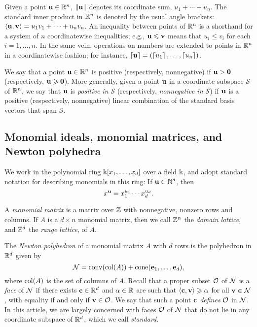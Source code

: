 \documentclass[11pt]{amsart}
\begin{document}
Given a point $\mathbf{u}\in \mathbb{R}^n$, $\| \mathbf{u} \|$ denotes its coordinate sum, $u_1+\cdots+u_n$.
The standard inner product in $\mathbb{R}^n$ is denoted by the usual angle brackets: $\langle \mathbf{u}, \mathbf{v} \rangle = u_1v_1 + \cdots + u_nv_n$.
An inequality between points of $\mathbb{R}^n$ is a shorthand for a system of $n$ coordinatewise inequalities; e.g., $\mathbf{u}\leqslant \mathbf{v}$ means that $u_i \le v_i$ for each $i=1,\ldots,n$.
In the same vein, operations on numbers are extended to points in $\mathbb{R}^n$ in a coordinatewise fashion; for instance, $\left\lceil \mathbf{u} \right\rceil=(\left\lceil u_1 \right\rceil,\ldots,\left\lceil u_n \right\rceil)$.

We say that a point $\mathbf{u}\in \mathbb{R}^n$ is positive (respectively, nonnegative) if $\mathbf{u} > \mathbf{0}$ (respectively, $\mathbf{u}\geqslant \mathbf{0}$).
More generally, given a point $\mathbf{u}$ in a coordinate subspace $\mathcal{S}$ of $\mathbb{R}^n$, we say that $\mathbf{u}$ is \emph{positive in $\mathcal{S}$} (respectively, \emph{nonnegative in $\mathcal{S}$}) if $\mathbf{u}$ is a positive (respectively, nonnegative) linear combination of the standard basis vectors that span $\mathcal{S}$.

\subsection{Monomial ideals, monomial matrices, and Newton polyhedra}
\label{monomial newton preliminaries: ss}
We work in the polynomial ring $\Bbbk[x_1, \ldots, x_d]$ over a field $\Bbbk$, and adopt standard notation for describing monomials in this ring:  If $\mathbf{u} \in \mathbb{N}^d$, then \[ x^{\mathbf{u}} = x_1^{u_1} \cdots x_d^{u_d}.\]

A \emph{monomial matrix} is a matrix over $\mathbb{Z}$ with nonnegative, nonzero rows and columns.
If $A$ is a $d \times n$ monomial matrix, then we call $\mathbb{Z}^n$ the \emph{domain lattice}, and $\mathbb{Z}^d$ the \emph{range lattice}, of $A$.

The \emph{Newton polyhedron} of a monomial matrix $A$ with $d$ rows is the polyhedron in $\mathbb{R}^d$ given by
\[ \mathcal{N} = \operatorname{conv}( \operatorname{col}(A) ) + \operatorname{cone}( \mathbf{e}_1, \ldots, \mathbf{e}_d), \]
where $\operatorname{col}(A)$ is the set of columns of $A$.
Recall that a proper subset $\mathcal{O}$ of $\mathcal{N}$ is a \emph{face} of $\mathcal{N}$ if there exists $\mathbf{c} \in \mathbb{R}^d$ and $\alpha \in \mathbb{R}$ are such that $\langle \mathbf{c}, \mathbf{v} \rangle \geqslant \alpha$ for all $\mathbf{v} \in \mathcal{N}$, with equality if and only if $\mathbf{v} \in \mathcal{O}$.
We say that such a point $\mathbf{c}$ \emph{defines} $\mathcal{O}$ in $\mathcal{N}$.  In this article, we are largely concerned with faces $\mathcal{O}$ of $\mathcal{N}$ that do not lie in any coordinate subspace of $\mathbb{R}^d$, which we call \emph{standard}.
\end{document}
